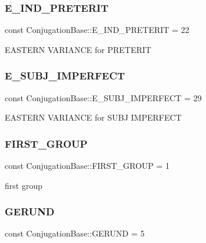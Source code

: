 \subsubsection{\texorpdfstring{E\+\_\+\+I\+N\+D\+\_\+\+P\+R\+E\+T\+E\+R\+IT}{E\_IND\_PRETERIT}}
{\footnotesize\ttfamily const Conjugation\+Base\+::\+E\+\_\+\+I\+N\+D\+\_\+\+P\+R\+E\+T\+E\+R\+IT = 22}

E\+A\+S\+T\+E\+RN V\+A\+R\+I\+A\+N\+CE for P\+R\+E\+T\+E\+R\+IT \hypertarget{classConjugationBase_afc268d8825396ff04f01d85deaf8c33f}{}\label{classConjugationBase_afc268d8825396ff04f01d85deaf8c33f} 
\subsubsection{\texorpdfstring{E\+\_\+\+S\+U\+B\+J\+\_\+\+I\+M\+P\+E\+R\+F\+E\+CT}{E\_SUBJ\_IMPERFECT}}
{\footnotesize\ttfamily const Conjugation\+Base\+::\+E\+\_\+\+S\+U\+B\+J\+\_\+\+I\+M\+P\+E\+R\+F\+E\+CT = 29}

E\+A\+S\+T\+E\+RN V\+A\+R\+I\+A\+N\+CE for S\+U\+BJ I\+M\+P\+E\+R\+F\+E\+CT \hypertarget{classConjugationBase_a98dfd89993e82fd8bd1cc855dac980fc}{}\label{classConjugationBase_a98dfd89993e82fd8bd1cc855dac980fc} 
\subsubsection{\texorpdfstring{F\+I\+R\+S\+T\+\_\+\+G\+R\+O\+UP}{FIRST\_GROUP}}
{\footnotesize\ttfamily const Conjugation\+Base\+::\+F\+I\+R\+S\+T\+\_\+\+G\+R\+O\+UP = 1}

first group \hypertarget{classConjugationBase_ace9d609af36ad729f01d6534c81caf4c}{}\label{classConjugationBase_ace9d609af36ad729f01d6534c81caf4c} 
\subsubsection{\texorpdfstring{G\+E\+R\+U\+ND}{GERUND}}
{\footnotesize\ttfamily const Conjugation\+Base\+::\+G\+E\+R\+U\+ND = 5}

